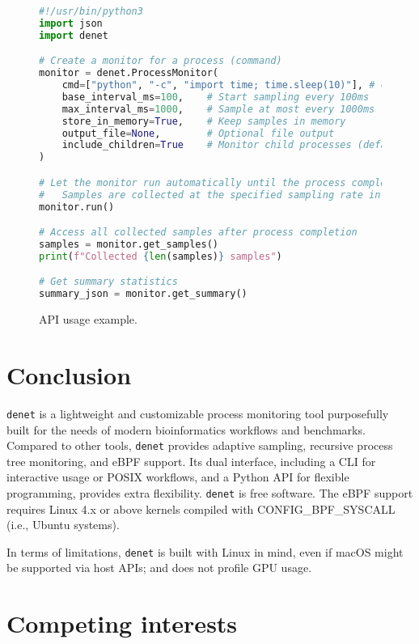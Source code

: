 \documentclass[10pt]{article}
\begin{document}
\begin{figure}[H]
\begin{lstlisting}[frame=single,language=python]
#!/usr/bin/python3
import json
import denet

# Create a monitor for a process (command)
monitor = denet.ProcessMonitor(
    cmd=["python", "-c", "import time; time.sleep(10)"], # command
    base_interval_ms=100,    # Start sampling every 100ms
    max_interval_ms=1000,    # Sample at most every 1000ms
    store_in_memory=True,    # Keep samples in memory
    output_file=None,        # Optional file output
    include_children=True    # Monitor child processes (default True)
)

# Let the monitor run automatically until the process completes.
#   Samples are collected at the specified sampling rate in the background
monitor.run()

# Access all collected samples after process completion
samples = monitor.get_samples()
print(f"Collected {len(samples)} samples")

# Get summary statistics
summary_json = monitor.get_summary()
\end{lstlisting}

\caption{API usage example. \label{fig:api}}
\end{figure}

\section*{Conclusion}

\texttt{denet} is a lightweight and customizable process monitoring tool purposefully built for the needs of modern bioinformatics workflows and benchmarks. Compared to other tools, \texttt{denet} provides adaptive sampling, recursive process tree monitoring, and eBPF support.  Its dual interface, including a CLI for interactive usage or POSIX workflows, and a Python API for flexible programming, provides extra flexibility. \texttt{denet} is free software. The eBPF support requires Linux 4.x or above kernels compiled with CONFIG\_BPF\_SYSCALL (i.e., Ubuntu systems).

In terms of limitations, \texttt{denet} is built with Linux in mind, even if macOS might be supported via host APIs; and does not profile GPU usage.

\section*{Competing interests}
\end{document}
